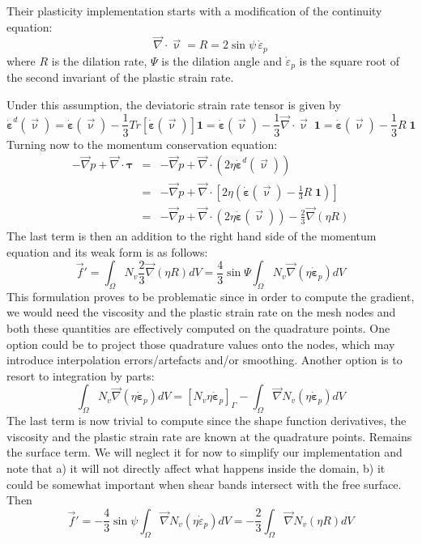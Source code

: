 Their plasticity implementation starts with a modification of the 
continuity equation:
\[
\vec\nabla\cdot\vec\upnu = R = 2 \sin\psi \, \dot{\varepsilon}_p
\]
where $R$ is the dilation rate, $\Psi$ is the dilation angle 
and $\dot{\varepsilon}_p$ is the square root of 
the second invariant of the plastic strain rate.

Under this assumption, the deviatoric strain rate tensor is given by
\begin{equation}
\dot{\bm \varepsilon}^d(\vec\upnu)
= \dot{\bm \varepsilon}(\vec\upnu)- \frac{1}{3} Tr[\dot{\bm \varepsilon}(\vec\upnu)] {\bm 1}
= \dot{\bm \varepsilon}(\vec\upnu)- \frac{1}{3} \vec\nabla\cdot\vec\upnu \; {\bm 1}
= \dot{\bm \varepsilon}(\vec\upnu)- \frac{1}{3} R \; {\bm 1}
\end{equation}
Turning now to the momentum conservation equation:
\begin{eqnarray}
-\vec\nabla p + \vec\nabla \cdot {\bm \tau} 
&=& -\vec\nabla p + \vec\nabla \cdot (2 \eta \dot{\bm \varepsilon}^d(\vec\upnu)) \nonumber \\
&=& -\vec\nabla p + \vec\nabla \cdot \left[ 2 \eta \left(\dot{\bm \varepsilon}(\vec\upnu)- \frac{1}{3} R \; {\bm 1}\right) \right] \nonumber\\
&=& -\vec\nabla p 
+ \vec\nabla \cdot \left( 2 \eta \dot{\bm \varepsilon}(\vec\upnu)\right) -\frac{2}{3} \vec\nabla(\eta R) 
\label{chpeform}
\end{eqnarray}
The last term is then an addition to the right hand side of the momentum equation 
and its weak form is as follows:
\begin{equation}
\vec f' 
= \int_\Omega N_v \frac{2}{3} \vec\nabla(\eta R) dV
= \frac{4}{3} \sin \Psi \int_\Omega N_v \vec\nabla(\eta \dot{\bm \varepsilon}_p) dV
\end{equation}
This formulation proves to be problematic since in order to compute the gradient, we would
need the viscosity and the plastic strain rate on the mesh nodes and both these quantities
are effectively computed on the quadrature points. One option could be to project those quadrature
values onto the nodes, which may introduce interpolation errors/artefacts and/or smoothing. 
Another option is to resort to integration by parts:
\begin{equation}
\int_\Omega N_v \vec\nabla(\eta \dot{\bm \varepsilon}_p) dV
= \left[ N_v \eta \dot{\bm \varepsilon}_p \right]_\Gamma 
-\int_\Omega \vec\nabla N_v (\eta \dot{\bm \varepsilon}_p) dV
\end{equation}
The last term is now trivial to compute since the shape function derivatives, the viscosity
and the plastic strain rate are known at the quadrature points. Remains the surface term. 
We will neglect it for now to simplify our implementation and note that a) it will not directly 
affect what happens inside the domain, b) it could be somewhat important when shear bands
intersect with the free surface. Then 
\begin{equation}
\vec f' 
=
-\frac{4}{3}\sin\psi\int_\Omega \vec\nabla N_v (\eta \dot{\varepsilon}_p) dV
=
-\frac{2}{3} \int_\Omega \vec\nabla N_v (\eta R) dV
\end{equation}

